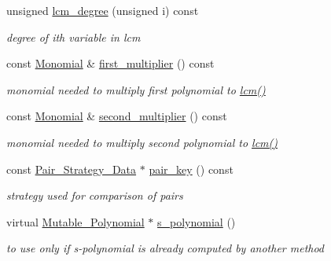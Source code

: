 \begin{Indent}
\begin{DoxyCompactItemize}
unsigned \hyperlink{group___g_b_computation_a4b9daf511d0ae94c24a5a0b8aa07588b}{lcm\+\_\+degree} (unsigned i) const
\begin{DoxyCompactList}\small\item\em degree of ith variable in lcm \end{DoxyCompactList}\item 
\mbox{\label{group___g_b_computation_a714e1ea76b993148dd55b05979b4b874}} 
const \hyperlink{group__polygroup_class_monomial}{Monomial} \& \hyperlink{group___g_b_computation_a714e1ea76b993148dd55b05979b4b874}{first\+\_\+multiplier} () const
\begin{DoxyCompactList}\small\item\em monomial needed to multiply first polynomial to \hyperlink{group___g_b_computation_a336387d4ddd4f184399212599dbcb130}{lcm()} \end{DoxyCompactList}\item 
\mbox{\label{group___g_b_computation_abb08fb4bfc80732a92438cc6856503a1}} 
const \hyperlink{group__polygroup_class_monomial}{Monomial} \& \hyperlink{group___g_b_computation_abb08fb4bfc80732a92438cc6856503a1}{second\+\_\+multiplier} () const
\begin{DoxyCompactList}\small\item\em monomial needed to multiply second polynomial to \hyperlink{group___g_b_computation_a336387d4ddd4f184399212599dbcb130}{lcm()} \end{DoxyCompactList}\item 
\mbox{\label{group___g_b_computation_a8fa18f909cc3b88af41a5796bd6c2424}} 
const \hyperlink{group__strategygroup_class_pair___strategy___data}{Pair\+\_\+\+Strategy\+\_\+\+Data} $\ast$ \hyperlink{group___g_b_computation_a8fa18f909cc3b88af41a5796bd6c2424}{pair\+\_\+key} () const
\begin{DoxyCompactList}\small\item\em strategy used for comparison of pairs \end{DoxyCompactList}\item 
virtual \hyperlink{group__polygroup_class_mutable___polynomial}{Mutable\+\_\+\+Polynomial} $\ast$ \hyperlink{group___g_b_computation_ab2dbac89b07b2acfad633a9de8f56fab}{s\+\_\+polynomial} ()
\begin{DoxyCompactList}\small\item\em to use only if s-\/polynomial is already computed by another method \end{DoxyCompactList}\end{DoxyCompactItemize}
\end{Indent}
